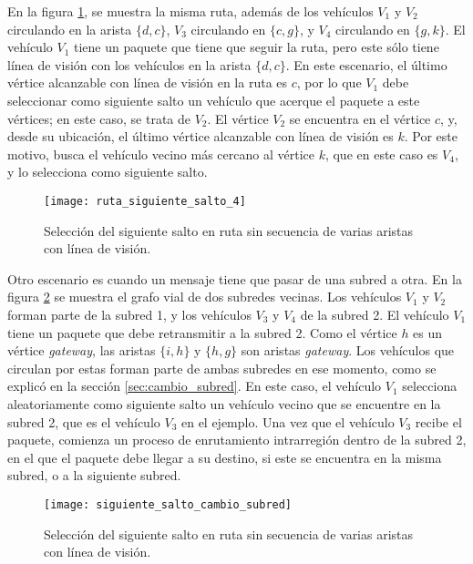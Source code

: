 En la figura \ref{fig:ruta_siguiente_salto_4}, se muestra la misma ruta, además
de los vehículos $V_1$ y $V_2$ circulando en la arista $\{d,c\}$, $V_3$
circulando en $\{c,g\}$, y $V_4$ circulando en $\{g,k\}$. El vehículo $V_1$
tiene un paquete que tiene que seguir la ruta, pero este sólo tiene línea de
visión con los vehículos en la arista $\{d,c\}$. En este escenario, el último
vértice alcanzable con línea de visión en la ruta es $c$, por lo que $V_1$ debe
seleccionar como siguiente salto un vehículo que acerque el paquete  a este
vértices; en este caso, se trata de $V_2$. El vértice $V_2$ se encuentra en el
vértice $c$, y, desde su ubicación, el último vértice alcanzable con línea de
visión es $k$. Por este motivo, busca el vehículo vecino más cercano al vértice
$k$, que en este caso es $V_4$, y lo selecciona como siguiente salto.

\begin{figure}[th!]
\centering
\texttt{[image: ruta\_siguiente\_salto\_4]}
\decoRule
\caption[Selección del siguiente salto en ruta sin secuencia de varias aristas
con línea de visión]{Selección del siguiente salto en ruta sin secuencia de
varias aristas con línea de visión.}
\label{fig:ruta_siguiente_salto_4}
\end{figure}

Otro escenario es cuando un mensaje tiene que pasar de una subred a otra. En la
figura \ref{fig:siguiente_salto_cambio_subred} se muestra el grafo vial de dos
subredes vecinas. Los vehículos $V_1$ y $V_2$ forman parte de la subred 1, y
los vehículos $V_3$ y $V_4$ de la subred 2. El vehículo $V_1$ tiene un paquete
que debe retransmitir a la subred 2. Como el vértice $h$ es un vértice
\textit{gateway}, las aristas $\{i,h\}$ y $\{h,g\}$ son aristas
\textit{gateway}. Los vehículos que circulan por estas forman parte de ambas
subredes en ese momento, como se explicó en la sección \ref{sec:cambio_subred}.
En este caso, el vehículo $V_1$ selecciona aleatoriamente como siguiente salto
un vehículo vecino que se encuentre en la subred 2, que es el vehículo $V_3$ en
el ejemplo. Una vez que el vehículo $V_3$ recibe el paquete, comienza un
proceso de enrutamiento intrarregión dentro de la subred 2, en el que el paquete
debe llegar a su destino, si este se encuentra en la misma subred, o a la
siguiente subred.

\begin{figure}[th!]
\centering
\texttt{[image: siguiente\_salto\_cambio\_subred]}
\decoRule
\caption[Selección del siguiente salto en ruta sin secuencia de varias aristas
con línea de visión]{Selección del siguiente salto en ruta sin secuencia de
varias aristas con línea de visión.}
\label{fig:siguiente_salto_cambio_subred}
\end{figure}

